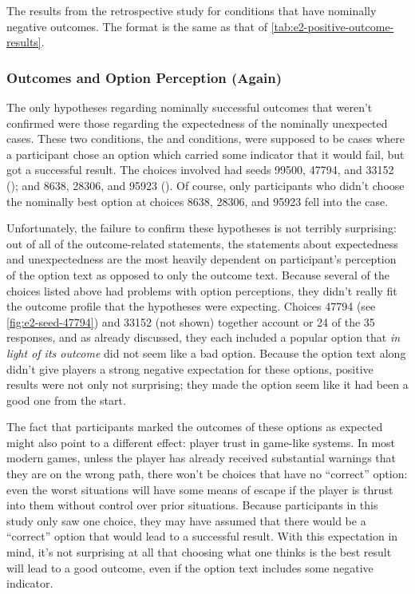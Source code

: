 \begin{table}[!p]
\centering
\bgroup
\def\arraystretch{1.3}
\setlength{\tabcolsep}{0.4em}

\egroup
\caption[Retrospective negative outcome results]{The results from the retrospective study for conditions that have nominally negative outcomes. The format is the same as that of \cref{tab:e2-positive-outcome-results}.}
\label{tab:e2-negative-outcome-results}
\end{table}


\subsubsection{Outcomes and Option Perception (Again)}

The only hypotheses regarding nominally successful outcomes that weren't confirmed were those regarding the expectedness of the nominally unexpected cases.
%
These two conditions, the \unxs{} and \obvfa{} conditions, were supposed to be cases where a participant chose an option which carried some indicator that it would fail, but got a successful result.
%
The choices involved had seeds 99500, 47794, and 33152 (\unxs{}); and 8638, 28306, and 95923 (\obvf{}).
%
Of course, only participants who didn't choose the nominally best option at choices 8638, 28306, and 95923 fell into the \obvfa{} case.


Unfortunately, the failure to confirm these hypotheses is not terribly surprising: out of all of the outcome-related statements, the statements about expectedness and unexpectedness are the most heavily dependent on participant's perception of the option text as opposed to only the outcome text.
%
Because several of the choices listed above had problems with option perceptions, they didn't really fit the outcome profile that the hypotheses were expecting.
%
Choices 47794 (see \cref{fig:e2-seed-47794}) and 33152 (not shown) together account or 24 of the 35 \unxs{} responses, and as already discussed, they each included a popular option that \emph{in light of its outcome} did not seem like a bad option.
%
Because the option text along didn't give players a strong negative expectation for these options, positive results were not only not surprising; they made the option seem like it had been a good one from the start.


The fact that participants marked the outcomes of these options as expected might also point to a different effect: player trust in game-like systems.
%
In most modern games, unless the player has already received substantial warnings that they are on the wrong path, there won't be choices that have no ``correct'' option: even the worst situations will have some means of escape if the player is thrust into them without control over prior situations.
%
Because participants in this study only saw one choice, they may have assumed that there would be a ``correct'' option that would lead to a successful result.
%
With this expectation in mind, it's not surprising at all that choosing what one thinks is the best result will lead to a good outcome, even if the option text includes some negative indicator.


